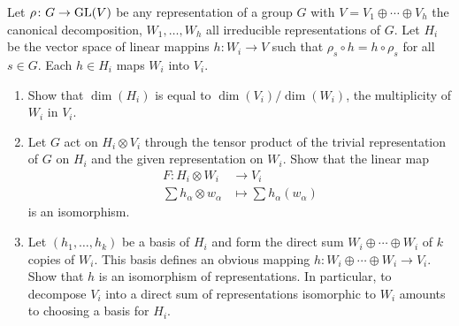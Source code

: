 \documentclass[letterpaper, 11pt, oneside]{book}
\begin{document}
\clearpage

\begin{exercise}\label{er:Serre_2_8}
  Let $\rho\colon G \to \operatorname{GL}(V)$ be any representation of a group $G$ with $V = V_{1} \oplus \cdots \oplus V_{h}$ the canonical decomposition, $W_{1}, \ldots, W_{h}$ all irreducible representations of $G$.
  Let $H_{i}$ be the vector space of linear mappins $h\colon W_{i} \to V$ such that $\rho_{s} \circ h = h \circ \rho_{s}$ for all $s \in G$.
  Each $h \in H_{i}$ maps $W_{i}$ into $V_{i}$.
  \begin{enumerate}
  \item Show that $\dim(H_{i})$ is equal to $\dim(V_{i}) / \dim(W_{i})$, the multiplicity of $W_{i}$ in $V_{i}$.
  \item Let $G$ act on $H_{i} \otimes V_{i}$ through the tensor product of the trivial representation of $G$ on $H_{i}$ and the given representation on $W_{i}$.
        Show that the linear map
        \begin{align*}
          F\colon H_{i} \otimes W_{i} &\to V_{i} \\
          \sum h_{\alpha} \otimes w_{\alpha} &\mapsto \sum h_{\alpha}(w_{\alpha})
        \end{align*}
        is an isomorphism.
  \item Let $(h_{1}, \ldots, h_{k})$ be a basis of $H_{i}$ and form the direct sum $W_{i} \oplus \cdots \oplus W_{i}$ of $k$ copies of $W_{i}$.
        This basis defines an obvious mapping $h\colon W_{i} \oplus \cdots \oplus W_{i} \to V_{i}$.
        Show that $h$ is an isomorphism of representations.
        In particular, to decompose $V_{i}$ into a direct sum of representations isomorphic to $W_{i}$ amounts to choosing a basis for $H_{i}$.
  \end{enumerate}
\end{exercise}
\end{document}
